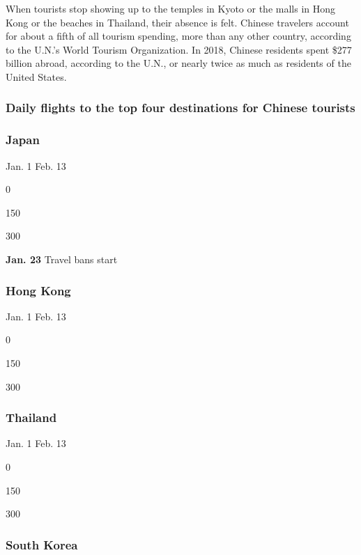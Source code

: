 When tourists stop showing up to the temples in Kyoto or the malls in
Hong Kong or the beaches in Thailand, their absence is felt. Chinese
travelers account for about a fifth of all tourism spending, more than
any other country, according to the U.N.'s World Tourism Organization.
In 2018, Chinese residents spent \$277 billion abroad, according to the
U.N., or nearly twice as much as residents of the United States.

\hypertarget{daily-flights-to-the-top-four-destinations-for-chinese-tourists}{%
\subsubsection{Daily flights to the top four destinations for Chinese
tourists}\label{daily-flights-to-the-top-four-destinations-for-chinese-tourists}}

\hypertarget{japan}{%
\subsubsection{Japan}\label{japan}}

Jan. 1 Feb. 13

0

150

300

\textbf{Jan. 23} Travel bans start

\hypertarget{hong-kong}{%
\subsubsection{Hong Kong}\label{hong-kong}}

Jan. 1 Feb. 13

0

150

300

\hypertarget{thailand}{%
\subsubsection{Thailand}\label{thailand}}

Jan. 1 Feb. 13

0

150

300

\hypertarget{south-korea}{%
\subsubsection{South Korea}\label{south-korea}}

